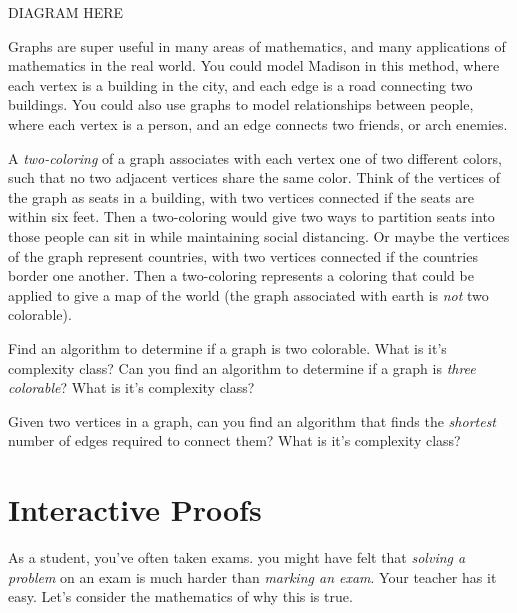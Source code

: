 \documentclass{article}
\theoremstyle{plain}
\theoremstyle{remark}
\theoremstyle{definition}
\begin{document}
DIAGRAM HERE

\vspace{4em}



Graphs are super useful in many areas of mathematics, and many applications of mathematics in the real world. You could model Madison in this method, where each vertex is a building in the city, and each edge is a road connecting two buildings. You could also use graphs to model relationships between people, where each vertex is a person, and an edge connects two friends, or arch enemies.

A \emph{two-coloring} of a graph associates with each vertex one of two different colors, such that no two adjacent vertices share the same color. Think of the vertices of the graph as seats in a building, with two vertices connected if the seats are within six feet. Then a two-coloring would give two ways to partition seats into those people can sit in while maintaining social distancing. Or maybe the vertices of the graph represent countries, with two vertices connected if the countries border one another. Then a two-coloring represents a coloring that could be applied to give a map of the world (the graph associated with earth is \emph{not} two colorable).

Find an algorithm to determine if a graph is two colorable. What is it's complexity class? Can you find an algorithm to determine if a graph is \emph{three colorable}? What is it's complexity class?

Given two vertices in a graph, can you find an algorithm that finds the \emph{shortest} number of edges required to connect them? What is it's complexity class?

\section{Interactive Proofs}

As a student, you've often taken exams. you might have felt that \emph{solving a problem} on an exam is much harder than \emph{marking an exam}. Your teacher has it easy. Let's consider the mathematics of why this is true.
\end{document}
